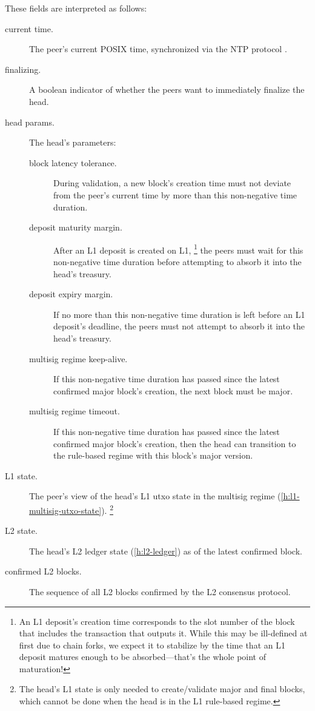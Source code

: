 \documentclass[../hydrozoa.tex]{subfiles}
\begin{document}
These fields are interpreted as follows:
\begin{description}
  \item[current time.] The peer's current POSIX time, synchronized via the NTP protocol \citep{MillsEtAlNetworkTimeProtocol2010}.
  \item[finalizing.] A boolean indicator of whether the peers want to immediately finalize the head.
  \item[head params.] The head's parameters:
    \begin{description}
      \item[block latency tolerance.] During validation, a new block's creation time must not deviate from the peer's current time by more than this non-negative time duration.
      \item[deposit maturity margin.] After an L1 deposit is created on L1,%
        \footnote{An L1 deposit's creation time corresponds to the slot number of the block that includes the transaction that outputs it.
          While this may be ill-defined at first due to chain forks, we expect it to stabilize by the time that an L1 deposit matures enough to be absorbed---that's the whole point of maturation!}
        the peers must wait for this non-negative time duration before attempting to absorb it into the head's treasury.
      \item[deposit expiry margin.] If no more than this non-negative time duration is left before an L1 deposit's deadline, the peers must not attempt to absorb it into the head's treasury.
      \item[multisig regime keep-alive.] If this non-negative time duration has passed since the latest confirmed major block's creation, the next block must be major.
      \item[multisig regime timeout.] If this non-negative time duration has passed since the latest confirmed major block's creation, then the head can transition to the rule-based regime with this block's major version.
    \end{description}
  \item[L1 state.] The peer's view of the head's L1 utxo state in the multisig regime (\cref{h:l1-multisig-utxo-state}).%
    \footnote{The head's L1 state is only needed to create/validate major and final blocks, which cannot be done when the head is in the L1 rule-based regime.}
  \item[L2 state.] The head's L2 ledger state (\cref{h:l2-ledger}) as of the latest confirmed block.
  \item[confirmed L2 blocks.] The sequence of all L2 blocks confirmed by the L2 consensus protocol.%

\end{description}
\end{document}
